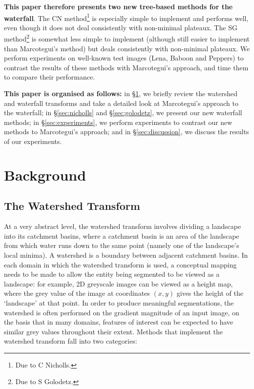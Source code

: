 \documentclass[review,a4paper]{elsarticle}
\begin{document}
\pagebreak

\textbf{This paper therefore presents two new tree-based methods for the waterfall}. The CN method\footnote{Due to C Nicholls.} is especially simple to implement and performs well, even though it does not deal consistently with non-minimal plateaux. The SG method\footnote{Due to S Golodetz.} is somewhat less simple to implement (although still easier to implement than Marcotegui's method) but deals consistently with non-minimal plateaux. We perform experiments on well-known test images (Lena, Baboon and Peppers) to contrast the results of these methods with Marcotegui's approach, and time them to compare their performance.

\textbf{This paper is organised as follows:} in \S\ref{sec:background}, we briefly review the watershed and waterfall transforms and take a detailed look at Marcotegui's approach to the waterfall; in \S\ref{sec:nicholls} and \S\ref{sec:golodetz}, we present our new waterfall methods; in \S\ref{sec:experiments}, we perform experiments to contrast our new methods to Marcotegui's approach; and in \S\ref{sec:discussion}, we discuss the results of our experiments.

\section{Background}
\label{sec:background}

\subsection{The Watershed Transform}

At a very abstract level, the watershed transform involves dividing a landscape into its catchment basins, where a catchment basin is an area of the landscape from which water runs down to the same point (namely one of the landscape's local minima). A watershed is a boundary between adjacent catchment basins. In each domain in which the watershed transform is used, a conceptual mapping needs to be made to allow the entity being segmented to be viewed as a landscape: for example, 2D greyscale images can be viewed as a height map, where the grey value of the image at coordinates $(x,y)$ gives the height of the `landscape' at that point. In order to produce meaningful segmentations, the watershed is often performed on the gradient magnitude of an input image, on the basis that in many domains, features of interest can be expected to have similar grey values throughout their extent. Methods that implement the watershed transform fall into two categories:
\end{document}
